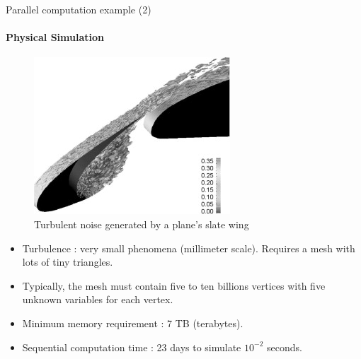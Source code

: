 \documentclass[compress,10pt,aspectratio=169]{beamer}
\begin{document}
\begin{frame}[fragile]{Parallel computation example (2)}
    \framesubtitle{Physical Simulation}
    \small
    \begin{multicols}{2}
        \begin{figure}[h]
            \includegraphics[width=.6\linewidth]{../images/SlatWingTurb1.jpg}
            \caption{Turbulent noise generated by a plane's slate wing}
        \end{figure}

        \begin{itemize}
            \item Turbulence : very small phenomena (millimeter scale). Requires     a mesh with lots of tiny triangles.
            \item Typically, the mesh must contain five to ten billions vertices with five unknown variables for each vertex.
            \item Minimum memory requirement : 7 TB (terabytes).
            \item Sequential computation time : 23 days to simulate $10^{-2}$ seconds.
        \end{itemize}
    \end{multicols}
\end{frame}
\end{document}
